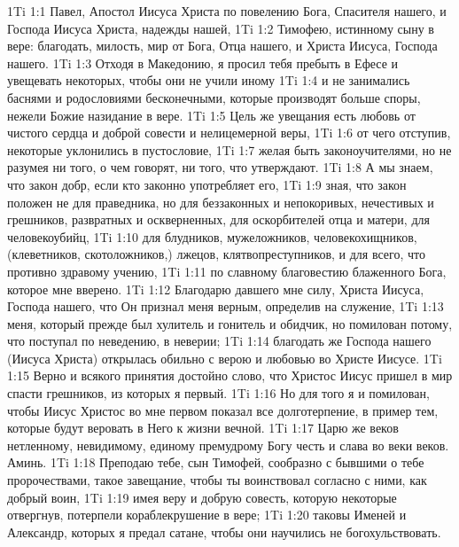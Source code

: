\vs 1Ti 1:1 Павел, Апостол Иисуса Христа по повелению Бога, Спасителя нашего, и Господа Иисуса Христа, надежды нашей,
\vs 1Ti 1:2 Тимофею, истинному сыну в вере: благодать, милость, мир от Бога, Отца нашего, и Христа Иисуса, Господа нашего.
\rsbpar\vs 1Ti 1:3 Отходя в Македонию, я просил тебя пребыть в Ефесе и увещевать некоторых, чтобы они не учили иному
\vs 1Ti 1:4 и не занимались баснями и родословиями бесконечными, которые производят больше споры, нежели Божие назидание в вере.
\vs 1Ti 1:5 Цель же увещания есть любовь от чистого сердца и доброй совести и нелицемерной веры,
\vs 1Ti 1:6 от чего отступив, некоторые уклонились в пустословие,
\vs 1Ti 1:7 желая быть законоучителями, но не разумея ни того, о чем говорят, ни того, что утверждают.
\vs 1Ti 1:8 А мы знаем, что закон добр, если кто законно употребляет его,
\vs 1Ti 1:9 зная, что закон положен не для праведника, но для беззаконных и непокоривых, нечестивых и грешников, развратных и оскверненных, для оскорбителей отца и матери, для человекоубийц,
\vs 1Ti 1:10 для блудников, мужеложников, человекохищников, (клеветников, скотоложников,) лжецов, клятвопреступников, и для всего, что противно здравому учению,
\vs 1Ti 1:11 по славному благовестию блаженного Бога, которое мне вверено.
\rsbpar\vs 1Ti 1:12 Благодарю давшего мне силу, Христа Иисуса, Господа нашего, что Он признал меня верным, определив на служение,
\vs 1Ti 1:13 меня, который прежде был хулитель и гонитель и обидчик, но помилован потому, что  поступал по неведению, в неверии;
\vs 1Ti 1:14 благодать же Господа нашего (Иисуса Христа) открылась  обильно с верою и любовью во Христе Иисусе.
\vs 1Ti 1:15 Верно и всякого принятия достойно слово, что Христос Иисус пришел в мир спасти грешников, из которых я первый.
\vs 1Ti 1:16 Но для того я и помилован, чтобы Иисус Христос во мне первом показал все долготерпение, в пример тем, которые будут веровать в Него к жизни вечной.
\vs 1Ti 1:17 Царю же веков нетленному, невидимому, единому премудрому Богу честь и слава во веки веков. Аминь.
\rsbpar\vs 1Ti 1:18 Преподаю тебе, сын  Тимофей, сообразно с бывшими о тебе пророчествами, такое завещание, чтобы ты воинствовал согласно с ними, как добрый воин,
\vs 1Ti 1:19 имея веру и добрую совесть, которую некоторые отвергнув, потерпели кораблекрушение в вере;
\vs 1Ti 1:20 таковы Именей и Александр, которых я предал сатане, чтобы они научились не богохульствовать.
